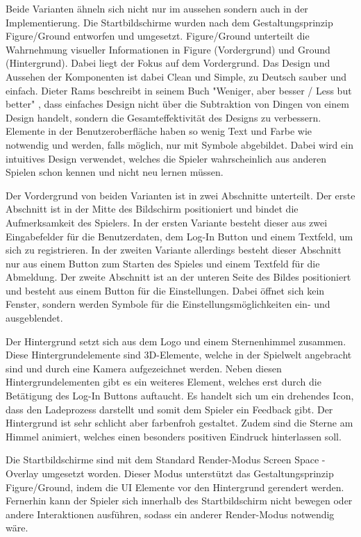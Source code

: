 				Beide Varianten ähneln sich nicht nur im aussehen sondern auch in der Implementierung. Die Startbildschirme wurden nach dem Gestaltungsprinzip Figure/Ground entworfen und umgesetzt. Figure/Ground unterteilt die Wahrnehmung visueller Informationen in Figure (Vordergrund) und Ground (Hintergrund). Dabei liegt der Fokus auf dem Vordergrund. Das Design und Aussehen der Komponenten ist dabei Clean und Simple, zu Deutsch sauber und einfach. Dieter Rams beschreibt in seinem Buch "Weniger, aber besser / Less but better" \cite{ramsDesign}, dass einfaches Design nicht über die Subtraktion von Dingen von einem Design handelt, sondern die Gesamteffektivität des Designs zu verbessern. Elemente in der Benutzeroberfläche haben so wenig Text und Farbe wie notwendig und werden, falls möglich, nur mit Symbole abgebildet. Dabei wird ein intuitives Design verwendet, welches die Spieler wahrscheinlich aus anderen Spielen schon kennen und nicht neu lernen müssen.

				Der Vordergrund von beiden Varianten ist in zwei Abschnitte unterteilt. Der erste Abschnitt ist in der Mitte des Bildschirm positioniert und bindet die Aufmerksamkeit des Spielers. In der ersten Variante besteht dieser aus zwei Eingabefelder für die Benutzerdaten, dem Log-In Button und einem Textfeld, um sich zu registrieren. In der zweiten Variante allerdings besteht dieser Abschnitt nur aus einem Button zum Starten des Spieles und einem Textfeld für die Abmeldung. Der zweite Abschnitt ist an der unteren Seite des Bildes positioniert und besteht aus einem Button für die Einstellungen. Dabei öffnet sich kein Fenster, sondern werden Symbole für die Einstellungsmöglichkeiten ein- und ausgeblendet.

				Der Hintergrund setzt sich aus dem Logo und einem Sternenhimmel zusammen. Diese Hintergrundelemente sind 3D-Elemente, welche in der Spielwelt angebracht sind und durch eine Kamera aufgezeichnet werden. Neben diesen Hintergrundelementen gibt es ein weiteres Element, welches erst durch die Betätigung des Log-In Buttons auftaucht. Es handelt sich um ein drehendes Icon, dass den Ladeprozess darstellt und somit dem Spieler ein Feedback gibt. Der Hintergrund ist sehr schlicht aber farbenfroh gestaltet. Zudem sind die Sterne am Himmel animiert, welches einen besonders positiven Eindruck hinterlassen soll.

				Die Startbildschirme sind mit dem Standard Render-Modus Screen Space - Overlay umgesetzt worden. Dieser Modus unterstützt das Gestaltungsprinzip Figure/Ground, indem die \ac{UI} Elemente vor den Hintergrund gerendert werden. Fernerhin kann der Spieler sich innerhalb des Startbildschirm nicht bewegen oder andere Interaktionen ausführen, sodass ein anderer Render-Modus notwendig wäre.

